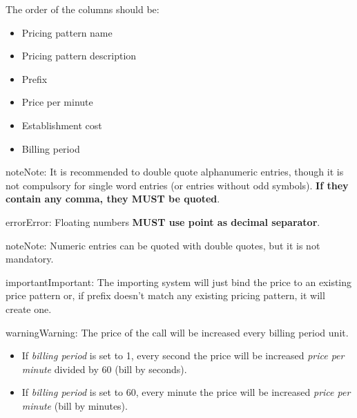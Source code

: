 \documentclass[letterpaper,10pt,english]{sphinxmanual}
\begin{document}
\noindent{}

The order of the columns should be:
\begin{itemize}
\item {} 
Pricing pattern name

\item {} 
Pricing pattern description

\item {} 
Prefix

\item {} 
Price per minute

\item {} 
Establishment cost

\item {} 
Billing period

\end{itemize}

\begin{notice}{note}{Note:}
It is recommended to double quote alphanumeric entries, though
it is not compulsory for single word entries (or entries without odd symbols).
\textbf{If they contain any comma, they MUST be quoted}.
\end{notice}

\begin{notice}{error}{Error:}
Floating numbers \textbf{MUST use point as decimal separator}.
\end{notice}

\begin{notice}{note}{Note:}
Numeric entries can be quoted with double quotes, but it is
not mandatory.
\end{notice}

\begin{notice}{important}{Important:}
The importing system will just bind the price to an existing
price pattern or, if prefix doesn't match any existing pricing pattern, it will
create one.
\end{notice}

\begin{notice}{warning}{Warning:}
The price of the call will be increased every billing period unit.
\begin{itemize}
\item {} 
If \emph{billing period} is set to 1, every second the price will be increased
\emph{price per minute} divided by 60 (bill by seconds).

\item {} 
If \emph{billing period} is set to 60, every minute the price will be increased
\emph{price per minute} (bill by minutes).

\end{itemize}
\end{notice}
\end{document}
